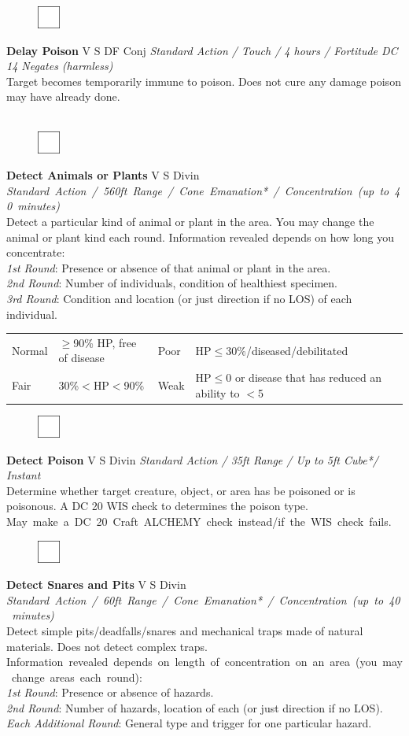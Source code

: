 \documentclass[letterpaper]{article}
\newcommand{\spell}[7]{
\begin{figure}
\vspace{-13pt}
\ifstrequal{#2}{Full}{\includegraphics[width=2em]{Checkbox-Full}}{
                      \includegraphics[width=2em]{Checkbox}}
\ifstrequal{#7}{}{\vspace{-1em}}{\vspace{#7}}
\end{figure}
\noindent \textbf{#1} #3 {
    \ifstrequal{#4}{Conj}{\color{Plum}Conj}{%
    \ifstrequal{#4}{Divin}{\color{YellowOrange}Divin}{%
    \ifstrequal{#4}{Ench}{\color{VioletRed}Ench}{%
    \ifstrequal{#4}{Trans}{\color{LimeGreen}Trans}{%
    \ifstrequal{#4}{Evoc}{\color{RedOrange}Evoc}{%
    \ifstrequal{#4}{Illu}{\color{ProcessBlue}Illu}{%
    \ifstrequal{#4}{Abjur}{\color{CadetBlue}Abjur}{%
    \ifstrequal{#4}{Necro}{\color{Red}Necro}{%
}}}}}}}}}
{\footnotesize \emph{#5}} \\
#6
}
\begin{document}
\spell{Delay Poison}{}{V S DF}{Conj}{Standard Action / Touch / 4 hours / Fortitude DC 14 Negates (harmless)}{%
Target becomes temporarily immune to poison. Does not cure any damage poison may have already done.\\}{}\\[-2em]

\spell{Detect Animals or Plants}{}{V S}{Divin}{\mbox{Standard Action / 560ft Range / Cone Emanation* / Concentration (up to 40 minutes)}}{%
Detect a particular kind of animal or plant in the area.  You may change the animal or plant kind each round. Information revealed depends on how long you concentrate: \\
\emph{1st Round}: Presence or absence of that animal or plant in the area.\\
\emph{2nd Round}: Number of individuals, condition of healthiest specimen.\\
\emph{3rd Round}: Condition and location (or just direction if no LOS) of each individual. \\
\begin{tabular}{l  l | l  l}
\hline
\footnotesize{Normal} & \footnotesize{$\geq$90\% HP, free of disease} & \footnotesize{Poor} & \footnotesize{HP$\leq$30\%/diseased/debilitated} \\
\footnotesize{Fair} & \footnotesize{30\%$<$HP$<$90\%} & \footnotesize{Weak} & \footnotesize{HP$\leq$0 or disease that has reduced an ability to $<$5} \\
\end{tabular}}{3em}

\spell{Detect Poison}{}{V S}{Divin}{Standard Action / 35ft Range / Up to 5ft Cube*/ Instant}{%
Determine whether target creature, object, or area has be poisoned or is poisonous.  A DC 20 WIS check to determines the poison type.  \mbox{May make a DC 20 Craft {\scriptsize ALCHEMY} check instead/if the WIS check fails.} \\[-1em]}{}

\spell{Detect Snares and Pits}{}{V S}{Divin}{\mbox{Standard Action / 60ft Range / Cone Emanation* / Concentration (up to 40 minutes)}}{%
Detect simple pits/deadfalls/snares and mechanical traps made of natural materials.  Does not detect complex traps. \mbox{Information revealed depends on length of concentration on an area (you may change areas each round):}\\
\emph{1st Round}: Presence or absence of hazards.\\
\emph{2nd Round}: Number of hazards, location of each (or just direction if no LOS).\\
\emph{Each Additional Round}: General type and trigger for one particular hazard.}{3em}\\[-1em]
\end{document}
